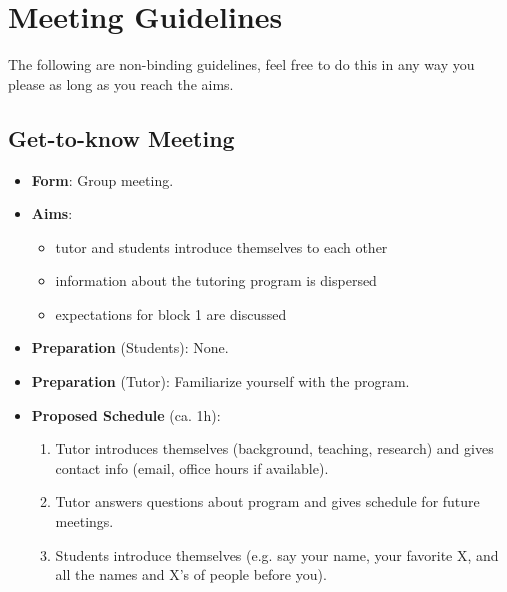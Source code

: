 \chapter{Meeting Guidelines}

The following are non-binding guidelines, feel free to do this in any way you please as long as you reach the aims.

\section{Get-to-know Meeting}

\begin{itemize}

	\item \textbf{Form}: Group meeting.

	\item \textbf{Aims}:

	\begin{itemize}

		\item tutor and students introduce themselves to each other

		\item information about the tutoring program is dispersed

		\item expectations for block 1 are discussed

	\end{itemize}

	\item \textbf{Preparation} (Students): None.

	\item \textbf{Preparation} (Tutor): Familiarize yourself with the program.

	\item \textbf{Proposed Schedule} (ca. 1h):

	\begin{enumerate}

		\item Tutor introduces themselves (background, teaching, research) and gives contact info (email, office hours if available).

		\item Tutor answers questions about program and gives schedule for future meetings.

		\item Students introduce themselves (e.g. say your name, your favorite X, and all the names and X's of people before you).


\end{enumerate}
\end{itemize}
